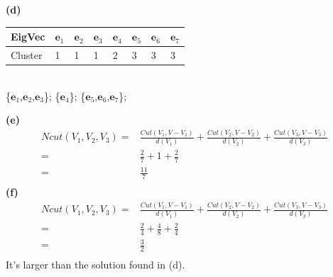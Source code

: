 \documentclass[11pt]{scrartcl}
\begin{document}
\textbf{(d)}\\
\begin{center}
\begin{tabular}{| p{1.75cm}| p{0.75cm}| p{0.75cm}| p{0.75cm}| p{0.75cm}| p{0.75cm}| p{0.75cm}| p{0.75cm}|}
    \hline
    EigVec&$\mathbf{e}_1$&$\mathbf{e}_2$&$\mathbf{e}_3$&$\mathbf{e}_4$&$\mathbf{e}_5$&$\mathbf{e}_6$&$\mathbf{e}_7$\\
    \hline
    Cluster&1&1&1&2&3&3&3\\
    \hline
\end{tabular}\\
\{$\mathbf{e}_1$,$\mathbf{e}_2$,$\mathbf{e}_3$\};
\{$\mathbf{e}_4$\};
\{$\mathbf{e}_5$,$\mathbf{e}_6$,$\mathbf{e}_7$\};\\
\end{center}
\textbf{(e)}\\
\begin{equation*}
\begin{aligned}
Ncut(V_1,V_2,V_3)=&
\frac{Cut(V_1,V-V_1)}{d(V_1)}
+\frac{Cut(V_2,V-V_2)}{d(V_2)}
+\frac{Cut(V_3,V-V_3)}{d(V_3)}\\
=&\frac{2}{7}+1+\frac{2}{7}\\
=&\frac{11}{7}\\
\end{aligned}
\end{equation*}
\textbf{(f)}\\
\begin{equation*}
\begin{aligned}
Ncut(V_1,V_2,V_3)=&
\frac{Cut(V_1,V-V_1)}{d(V_1)}
+\frac{Cut(V_2,V-V_2)}{d(V_2)}
+\frac{Cut(V_3,V-V_3)}{d(V_3)}\\
=&\frac{2}{4}+\frac{4}{8}+\frac{2}{4}\\
=&\frac{3}{2}\\
\end{aligned}
\end{equation*}
It's larger than the solution found in (d).
\end{document}

